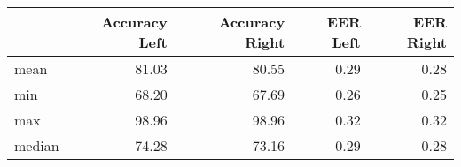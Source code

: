 \begin{tabular}{lrrrr}
\toprule
{} &  Accuracy Left &  Accuracy Right &  EER Left &  EER Right \\
\midrule
mean   &          81.03 &           80.55 &      0.29 &       0.28 \\
min    &          68.20 &           67.69 &      0.26 &       0.25 \\
max    &          98.96 &           98.96 &      0.32 &       0.32 \\
median &          74.28 &           73.16 &      0.29 &       0.28 \\
\bottomrule
\end{tabular}
